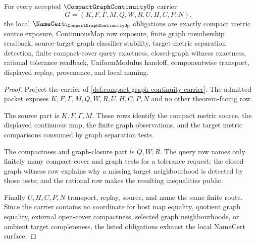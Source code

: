 \begin{theorem}
\label{thm:compact-graph-continuity-namecert-obligations}
For every accepted $\CompactGraphContinuityUp$ carrier
$$
G=(K,F,\Gamma,M,Q,W,R,U,H,C,P,N),
$$
the local $\NameCert_{\CompactGraphContinuityUp}$ obligations are exactly compact metric source exposure, ContinuousMap row exposure, finite graph membership readback, source-target graph classifier stability, target-metric separation detection, finite compact-cover query exactness, closed-graph witness exactness, rational tolerance readback, UniformModulus handoff, componentwise transport, displayed replay, provenance, and local naming.
\end{theorem}
\begin{proof}
Project the carrier of \autoref{def:compact-graph-continuity-carrier}. The admitted packet exposes $K,F,\Gamma,M,Q,W,R,U,H,C,P,N$ and no other theorem-facing row.

The source part is $K,F,\Gamma,M$. These rows identify the compact metric source, the displayed continuous map, the finite graph observations, and the target metric comparisons consumed by graph separation tests.

The compactness and graph-closure part is $Q,W,R$. The query row names only finitely many compact-cover and graph tests for a tolerance request; the closed-graph witness row explains why a missing target neighbourhood is detected by those tests; and the rational row makes the resulting inequalities public.

Finally $U,H,C,P,N$ transport, replay, source, and name the same finite route. Since the carrier contains no coordinate for host map equality, quotient graph equality, external open-cover compactness, selected graph neighbourhoods, or ambient target completeness, the listed obligations exhaust the local NameCert surface.
\end{proof}

